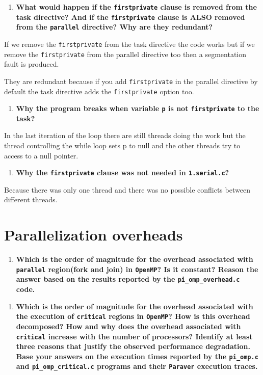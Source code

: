 \documentclass[a4paper]{article}
\begin{document}
\begin{enumerate}[resume]
	\item \textbf{What would happen if the \texttt{firstprivate} clause is removed from the task directive? And if the \texttt{firstprivate} clause is ALSO removed from the \texttt{parallel} directive? Why are they redundant?}
\end{enumerate}

If we remove the \texttt{firstprivate} from the task directive the code works but if we remove the \texttt{firstprivate} from the parallel directive too then a segmentation fault is produced. 

They are redundant because if you add \texttt{firstprivate} in the parallel directive by default the task directive adds the \texttt{firstprivate} option too.

\begin{enumerate}[resume]
	\item \textbf{Why the program breaks when variable \texttt{p} is not \texttt{firstprivate} to the task?}
\end{enumerate}

In the last iteration of the loop there are still threads doing the work but the thread controlling the while loop sets p to null and the other threads try to access to a null pointer.

\begin{enumerate}[resume]
	\item \textbf{Why the \texttt{firstprivate} clause was not needed in \texttt{1.serial.c}?}
\end{enumerate}

Because there was only one thread and there was no possible conflicts between different threads.

\section{Parallelization overheads}

\begin{enumerate}
	\item \textbf{Which is the order of magnitude for the overhead associated with \texttt{parallel} region(fork and join) in \texttt{OpenMP}? Is it constant? Reason the answer based on the results reported by the \texttt{pi\_omp\_overhead.c} code.}
\end{enumerate}

\begin{enumerate}[resume]
	\item \textbf{Which is the order of magnitude for the overhead associated with the execution of \texttt{critical} regions in \texttt{OpenMP}? How is this overhead decomposed? How and why does the overhead associated with \texttt{critical} increase with the number of processors? Identify at least three reasons that justify the observed performance degradation. Base your answers on the execution times reported by the \texttt{pi\_omp.c} and \texttt{pi\_omp\_critical.c} programs and their \texttt{Paraver} execution traces.}
\end{enumerate}
\end{document}
